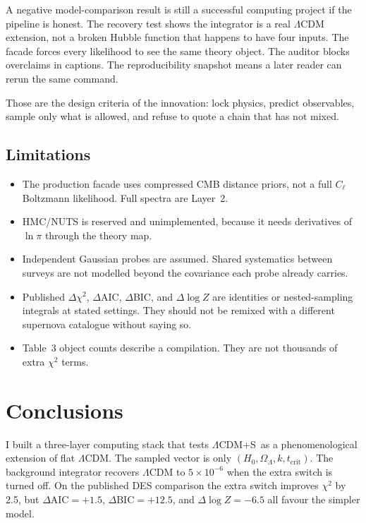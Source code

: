 \documentclass[12pt,letterpaper]{article}
\newcommand{\Lcdms}{$\Lambda$CDM+S}
\newcommand{\tcrit}{t_{\mathrm{crit}}}
\begin{document}
A negative model-comparison result is still a successful computing
project if the pipeline is honest. The recovery test shows the
integrator is a real $\Lambda$CDM extension, not a broken Hubble
function that happens to have four inputs. The facade forces every
likelihood to see the same theory object. The auditor blocks
overclaims in captions. The reproducibility snapshot means a later
reader can rerun the same command.

Those are the design criteria of the innovation: lock physics, predict
observables, sample only what is allowed, and refuse to quote a
chain that has not mixed.

\subsection{Limitations}

\begin{itemize}[leftmargin=1.6em]
  \item The production facade uses compressed CMB distance priors, not
        a full $C_\ell$ Boltzmann likelihood. Full spectra are Layer~2.
  \item HMC/NUTS is reserved and unimplemented, because it needs
        derivatives of $\ln\pi$ through the theory map.
  \item Independent Gaussian probes are assumed. Shared systematics
        between surveys are not modelled beyond the covariance each
        probe already carries.
  \item Published $\Delta\chi^2$, $\Delta$AIC, $\Delta$BIC, and
        $\Delta\log Z$ are identities or nested-sampling integrals at
        stated settings. They should not be remixed with a different
        supernova catalogue without saying so.
  \item Table~3 object counts describe a compilation. They are not
        thousands of extra $\chi^2$ terms.
\end{itemize}

\section{Conclusions}

I built a three-layer computing stack that tests \Lcdms\ as a
phenomenological extension of flat $\Lambda$CDM. The sampled vector is
only $(H_0,\Omega_\Lambda,k,\tcrit)$. The background integrator
recovers $\Lambda$CDM to $5\times 10^{-6}$ when the extra switch is
turned off. On the published DES comparison the extra switch improves
$\chi^2$ by 2.5, but $\Delta\mathrm{AIC}=+1.5$,
$\Delta\mathrm{BIC}=+12.5$, and $\Delta\log Z=-6.5$ all favour the
simpler model.
\end{document}
